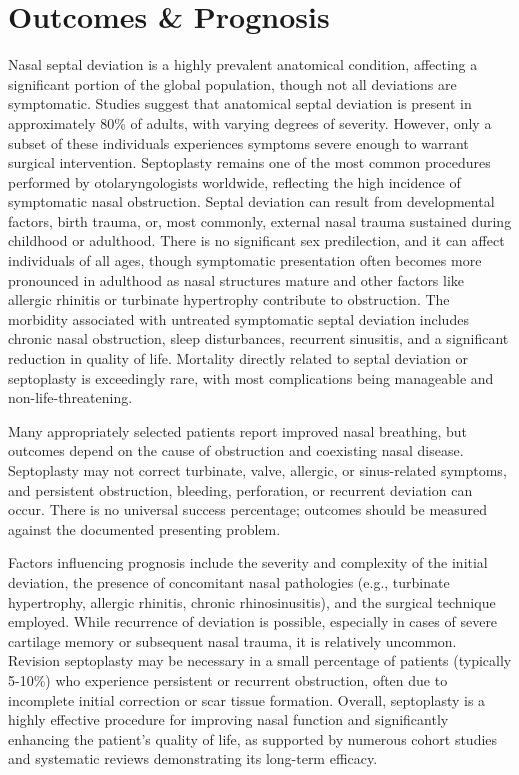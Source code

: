 \section*{Outcomes \& Prognosis}
Nasal septal deviation is a highly prevalent anatomical condition, affecting a significant portion of the global population, though not all deviations are symptomatic. Studies suggest that anatomical septal deviation is present in approximately 80\% of adults, with varying degrees of severity. However, only a subset of these individuals experiences symptoms severe enough to warrant surgical intervention. Septoplasty remains one of the most common procedures performed by otolaryngologists worldwide, reflecting the high incidence of symptomatic nasal obstruction. Septal deviation can result from developmental factors, birth trauma, or, most commonly, external nasal trauma sustained during childhood or adulthood. There is no significant sex predilection, and it can affect individuals of all ages, though symptomatic presentation often becomes more pronounced in adulthood as nasal structures mature and other factors like allergic rhinitis or turbinate hypertrophy contribute to obstruction. The morbidity associated with untreated symptomatic septal deviation includes chronic nasal obstruction, sleep disturbances, recurrent sinusitis, and a significant reduction in quality of life. Mortality directly related to septal deviation or septoplasty is exceedingly rare, with most complications being manageable and non-life-threatening.

Many appropriately selected patients report improved nasal breathing, but outcomes depend on the cause of obstruction and coexisting nasal disease. Septoplasty may not correct turbinate, valve, allergic, or sinus-related symptoms, and persistent obstruction, bleeding, perforation, or recurrent deviation can occur. There is no universal success percentage; outcomes should be measured against the documented presenting problem.

Factors influencing prognosis include the severity and complexity of the initial deviation, the presence of concomitant nasal pathologies (e.g., turbinate hypertrophy, allergic rhinitis, chronic rhinosinusitis), and the surgical technique employed. While recurrence of deviation is possible, especially in cases of severe cartilage memory or subsequent nasal trauma, it is relatively uncommon. Revision septoplasty may be necessary in a small percentage of patients (typically 5-10\%) who experience persistent or recurrent obstruction, often due to incomplete initial correction or scar tissue formation. Overall, septoplasty is a highly effective procedure for improving nasal function and significantly enhancing the patient's quality of life, as supported by numerous cohort studies and systematic reviews demonstrating its long-term efficacy.

